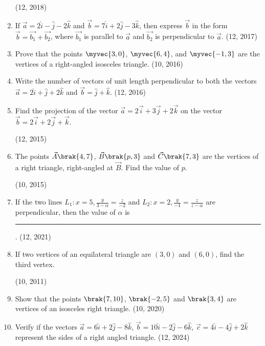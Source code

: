 \begin{enumerate}[label=\thesubsection.\arabic*, ref=\thesubsection.\theenumi]
\hfill (12, 2018) 
    \item If $\vec{a} = 2\hat{i} - \hat{j} - 2\hat{k}$ and $\vec{b} = 7\hat{i} + 2\hat{j} - 3\hat{k}$, then express $\vec{b}$ in the form $\vec{b} = \vec{b_1} + \vec{b_2}$, where $\vec{b_1}$ is parallel to $\vec{a}$ and $\vec{b_2}$ is perpendicular to $\vec{a}$. \hfill (12, 2017)
    \item Prove that the points $\myvec{3,0}$, $\myvec{6,4}$, and $\myvec{-1,3}$ are the vertices of a right-angled isosceles triangle. \hfill (10, 2016)
\item Write the number of vectors of unit length perpendicular to both the vectors
          $\vec{a}  = 2 \hat{i} + \hat{j} +2\hat{k}$  and 
          $\vec{b}  = \hat{j}+\hat{k}$.
\hfill (12, 2016)
\item Find the projection of the vector $\vec{a}=2\overrightarrow{i}+3\overrightarrow{j}+2\overrightarrow{k}$ on the vector $\vec{b}=2\overrightarrow{i}+2\overrightarrow{j}+\overrightarrow{k}$.

	\hfill (12, 2015)
\item The points $\vec{A}\brak{4, 7}$, $\vec{B}\brak{p, 3}$ and $\vec{C}\brak{7, 3}$ are the vertices of a right triangle, right-angled at $\vec{B}$. Find the value of $p$.

	\hfill (10, 2015)
\item If the two lines
     $L_1 : x=5,\frac{y}{3-\alpha}=\frac{z}{-2}$ and
     $L_2 : x=2,\frac{y}{-1}=\frac{z}{z-\alpha}$ 
are perpendicular, then the value of $\alpha$  is \rule{1cm}{0.2pt}.
\hfill (12, 2021)
    \item If two vertices of an equilateral triangle are $(3,0)$ and $(6,0)$, find the third vertex.   

\hfill (10, 2011)
\item Show that the points $\brak{7, 10}$, $\brak{-2, 5}$ and $\brak{3, 4}$ are vertices of an isosceles right triangle.
\hfill (10, 2020)
\item Verify if 
the vectors 
$\overrightarrow{a}=6\hat{i}+2\hat{j}-8\hat{k}$, 
$\overrightarrow{b} = 10\hat{i}-2\hat{j}-6\hat{k}$,  
$\overrightarrow{c} = 4\hat{i}-4\hat{j}+2\hat{k}$  
represent the sides of a right angled triangle.                  
		\hfill (12, 2024)
\end{enumerate}

